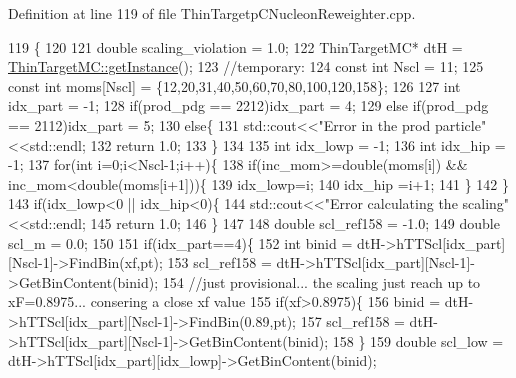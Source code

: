 Definition at line 119 of file Thin\-Targetp\-C\-Nucleon\-Reweighter.\-cpp.


\begin{DoxyCode}
119                                                                                                            
                   \{
120  
121     \textcolor{keywordtype}{double} scaling\_violation = 1.0;
122     ThinTargetMC*  dtH =  \hyperlink{class_neutrino_flux_reweight_1_1_thin_target_m_c_a2a114747fed2677cd3b7213555c002b9}{ThinTargetMC::getInstance}();
123     \textcolor{comment}{//temporary:}
124     \textcolor{keyword}{const} \textcolor{keywordtype}{int} Nscl = 11;
125     \textcolor{keyword}{const} \textcolor{keywordtype}{int} moms[Nscl] = \{12,20,31,40,50,60,70,80,100,120,158\};
126     
127     \textcolor{keywordtype}{int} idx\_part = -1;
128     \textcolor{keywordflow}{if}(prod\_pdg == 2212)idx\_part = 4;
129     \textcolor{keywordflow}{else} \textcolor{keywordflow}{if}(prod\_pdg == 2112)idx\_part = 5;
130     \textcolor{keywordflow}{else}\{
131       std::cout<<\textcolor{stringliteral}{"Error in the prod particle"}<<std::endl;
132       \textcolor{keywordflow}{return} 1.0;
133     \}
134     
135     \textcolor{keywordtype}{int} idx\_lowp = -1;
136     \textcolor{keywordtype}{int} idx\_hip  = -1;
137     \textcolor{keywordflow}{for}(\textcolor{keywordtype}{int} i=0;i<Nscl-1;i++)\{
138       \textcolor{keywordflow}{if}(inc\_mom>=\textcolor{keywordtype}{double}(moms[i]) && inc\_mom<\textcolor{keywordtype}{double}(moms[i+1]))\{
139         idx\_lowp=i;
140         idx\_hip =i+1;
141       \}
142     \}
143     \textcolor{keywordflow}{if}(idx\_lowp<0 || idx\_hip<0)\{
144       std::cout<<\textcolor{stringliteral}{"Error calculating the scaling"}<<std::endl;
145       \textcolor{keywordflow}{return} 1.0;
146     \}
147 
148     \textcolor{keywordtype}{double} scl\_ref158 = -1.0;
149     \textcolor{keywordtype}{double} scl\_m      =  0.0;
150 
151     \textcolor{keywordflow}{if}(idx\_part==4)\{
152       \textcolor{keywordtype}{int} binid = dtH->hTTScl[idx\_part][Nscl-1]->FindBin(xf,pt);
153       scl\_ref158 = dtH->hTTScl[idx\_part][Nscl-1]->GetBinContent(binid);    
154       \textcolor{comment}{//just provisional... the scaling just reach up to xF=0.8975... consering a close xf value}
155       \textcolor{keywordflow}{if}(xf>0.8975)\{
156         binid = dtH->hTTScl[idx\_part][Nscl-1]->FindBin(0.89,pt);
157         scl\_ref158 = dtH->hTTScl[idx\_part][Nscl-1]->GetBinContent(binid); 
158       \}
159       \textcolor{keywordtype}{double} scl\_low = dtH->hTTScl[idx\_part][idx\_lowp]->GetBinContent(binid);

\end{DoxyCode}
